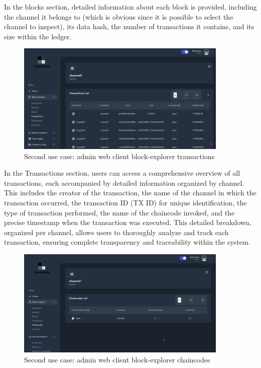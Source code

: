 In the blocks section, detailed information about each block is provided, including the channel it belongs to (which is obvious since it is possible to select the channel to inspect), its data hash, the number of transactions it contains, and its size within the ledger.

\begin{figure}[H]
    \centering
    \includegraphics[width=0.9\textwidth]{assets/use-case-2/block-explorer-transactions.png} %
    \caption{Second use case: admin web client block-explorer transactions}
    \label{fig:sample-image} 
\end{figure}

In the Transactions section, users can access a comprehensive overview of all transactions, each accompanied by detailed information organized by channel. This includes the creator of the transaction, the name of the channel in which the transaction occurred, the transaction ID (TX ID) for unique identification, the type of transaction performed, the name of the chaincode invoked, and the precise timestamp when the transaction was executed. This detailed breakdown, organized per channel, allows users to thoroughly analyze and track each transaction, ensuring complete transparency and traceability within the system.

\begin{figure}[H]
    \centering
    \includegraphics[width=0.9\textwidth]{assets/use-case-2/block-explorer-chaincode.png} %
    \caption{Second use case: admin web client block-explorer chaincodes}
    \label{fig:sample-image} 
\end{figure}

